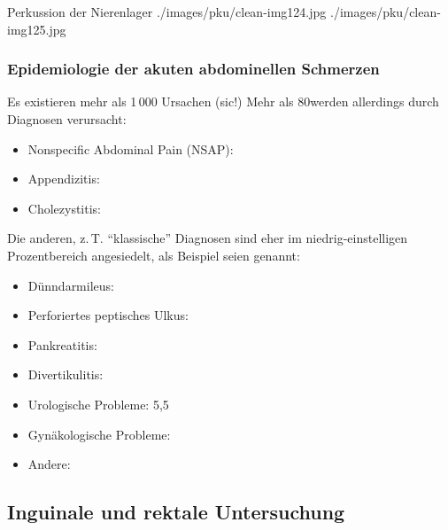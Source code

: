 \begin{PictureSeries}{}{Perkussion der Nierenlager}
{./images/pku/clean-img124.jpg}
{}
{./images/pku/clean-img125.jpg}
{}
{}
{}
{}
{}
\end{PictureSeries}





\subsubsection{Epidemiologie der akuten abdominellen Schmerzen}

Es existieren mehr als 1\,000 Ursachen (sic!) Mehr als 
80\PC* werden allerdings durch  Diagnosen
verursacht:
\begin{itemize}
  \item Nonspecific Abdominal Pain (NSAP):  \PC* 
  \item Appendizitis: \PC*
  \item Cholezystitis: \PC*
\end{itemize}

Die anderen, z.\,T. \enquote{klassische} Diagnosen sind eher im
niedrig-einstelligen Prozentbereich angesiedelt, als
Beispiel seien genannt: 

\begin{itemize}
  \item Dünndarmileus: \PC*
  \item Perforiertes peptisches Ulkus:
  \PC*
  \item Pankreatitis: \PC*
  \item Divertikulitis: \PC*
  \item Urologische Probleme: 5,5\PC*
  \item Gynäkologische Probleme: \PC*
  \item Andere: \PC*
\end{itemize}





\bigskip
\subsection{\CO{[D2]} Inguinale und rektale Untersuchung}





